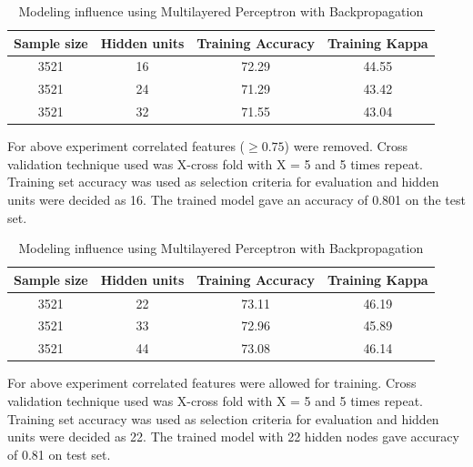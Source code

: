 \documentclass[conference]{IEEEtran}
\begin{document}
\begin{table}[H]
\renewcommand{\arraystretch}{1.3}
\caption{Modeling influence using Multilayered Perceptron with Backpropagation}
\label{table}
\centering
\begin{tabular}{|c|c|c|c|}
  \hline
\multicolumn{1}{|c|}{\textbf{Sample size}} & \multicolumn{1}{c|}{\textbf{Hidden units}} & \multicolumn{1}{c|}{\textbf{Training Accuracy}} & \multicolumn{1}{c|}{\textbf{Training Kappa}}\\
  \hline
  3521 &  16 & 72.29 & 44.55\\
  \hline
  3521 &  24 & 71.29 & 43.42\\
  \hline
  3521 &  32 & 71.55 & 43.04\\
  \hline
\end{tabular}
\end{table}

For above experiment correlated features ($\geq{0.75}$) were removed. Cross validation technique used was X-cross fold with X = 5 and 5 times repeat. Training set accuracy was used as selection criteria for evaluation and hidden units were decided as 16. The trained model gave an accuracy of 0.801 on the test set.


\begin{table}[!h]
\renewcommand{\arraystretch}{1.3}
\caption{Modeling influence using Multilayered Perceptron with Backpropagation}
\label{table}
\centering
\begin{tabular}{|c|c|c|c|}
  \hline
\multicolumn{1}{|c|}{\textbf{Sample size}} & \multicolumn{1}{c|}{\textbf{Hidden units}} & \multicolumn{1}{c|}{\textbf{Training Accuracy}} & \multicolumn{1}{c|}{\textbf{Training Kappa}}\\
  \hline
  3521 &  22 & 73.11 & 46.19\\
  \hline
  3521 &  33 & 72.96 & 45.89\\
  \hline
  3521 &  44 & 73.08 & 46.14\\
  \hline
\end{tabular}
\end{table}


For above experiment correlated features were allowed for training. Cross validation technique used was X-cross fold with X = 5 and 5 times repeat. Training set accuracy was used as selection criteria for evaluation and hidden units were decided as 22. The trained model with 22 hidden nodes gave accuracy of 0.81 on test set.
\end{document}
